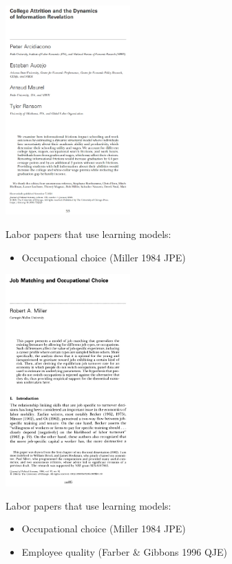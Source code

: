\documentclass[aspectratio=169]{beamer}
\begin{document}
\begin{frame}
\centering
\includegraphics[width=0.36\textwidth]{AHMR_2025_JPE_cover.jpg}
\end{frame}








\begin{frame}
Labor papers that use learning models:
\bigskip\par
\begin{itemize}
\itemsep1.5em
\item Occupational choice (Miller 1984 JPE)
\end{itemize}
\end{frame}

\begin{frame}
\centering
\includegraphics[width=0.36\textwidth]{Miller_1984_JPE_cover.jpg}
\end{frame}


\begin{frame}
Labor papers that use learning models:
\bigskip\par
\begin{itemize}
\itemsep1.5em
\item Occupational choice (Miller 1984 JPE)
\item Employee quality (Farber \& Gibbons 1996 QJE)
\end{itemize}
\end{frame}
\end{document}
